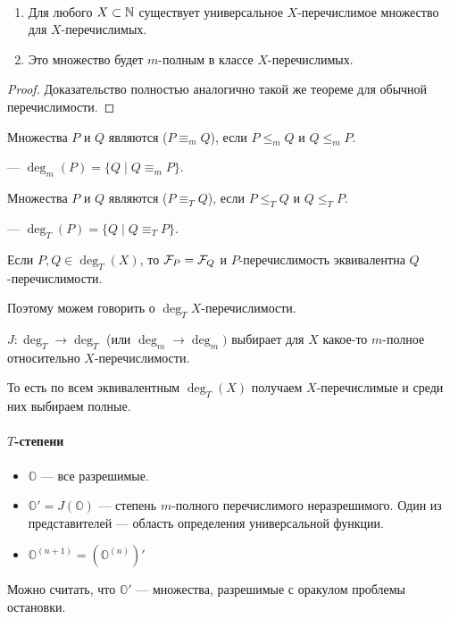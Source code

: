 \begin{thm}
	~\begin{enumerate}
	    \item Для любого $X \subset \mathbb{N}  $ существует универсальное $ X$-перечислимое множество для $ X$-перечислимых.
		\item Это множество будет $ m$-полным в классе $ X$-перечислимых.
	\end{enumerate} 
\end{thm}
	\begin{proof}
	    Доказательство полностью аналогично такой же теореме для обычной перечислимости.
	\end{proof}

\begin{defn}[]
	Множества $ P$ и $ Q$ являются  ($ P \equiv _m Q$), если $ P \le _m Q$ и $ Q \le _m P$.

	\noindent
	 --- $ \deg_m(P) = \{Q \mid Q \equiv _m P\} $.
\end{defn}

\begin{defn}[]
	Множества $ P$ и $ Q$ являются  ($ P \equiv _T Q$), если $ P \le _T Q$ и $ Q \le _T P$.

	\noindent
	 --- $ \deg_T(P) = \{Q \mid Q \equiv _T P\} $.
\end{defn}

\begin{note}
	Если $ P, Q \in \deg_T(X)$, то $ \mathcal{F}_P = \mathcal{F}_Q$ и  $ P$-перечислимость  эквивалентна  $ Q$-перечислимости.

	Поэтому можем говорить о $\deg_T X$-перечислимости.
\end{note}

\begin{defn}
	 $ J\colon \deg_T \to \deg_T $ (или $ \deg_m \to \deg_m) $ выбирает для $ X$ какое-то $ m$-полное относительно $ X$-перечислимости.

	\noindent
	То есть по всем эквивалентным $ \deg_T(X)$ получаем $ X$-перечислимые и среди них выбираем полные. 
\end{defn}
\begin{figure}[ht]
    \centering
    \label{fig:jump-img}
\end{figure}

\paragraph{$ T$-степени}
\begin{itemize}
	\item $ \mathbb{O}$ --- все разрешимые.
	\item $ \mathbb{O}' = J(\mathbb{O}) $ --- степень $ m$-полного перечислимого неразрешимого. Один из представителей --- область определения универсальной функции.
	\item $ \mathbb{O}^{(n+1)}= \left(\mathbb{O}^{(n)}\right)'$
\end{itemize}
Можно считать, что $ \mathbb{O}'$ --- множества, разрешимые с оракулом проблемы остановки. 

